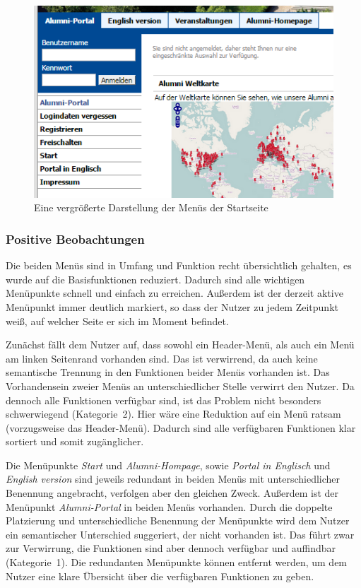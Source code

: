 \begin{figure}[h]
	\centering
		\includegraphics[width=\textwidth]{figures/menu.png}
	\caption{Eine vergrößerte Darstellung der Menüs der Startseite}
	\label{fig:menu}
\end{figure}


\subsubsection*{Positive Beobachtungen}
Die beiden Menüs sind in Umfang und Funktion recht übersichtlich gehalten, es wurde auf die Basisfunktionen reduziert. Dadurch sind alle wichtigen Menüpunkte schnell und einfach zu erreichen. 
Außerdem ist der derzeit aktive Menüpunkt immer deutlich markiert, so dass der Nutzer zu jedem Zeitpunkt weiß, auf welcher Seite er sich im Moment befindet.

{Zunächst fällt dem Nutzer auf, dass sowohl ein Header-Menü, als auch ein Menü am linken Seitenrand vorhanden sind. Das ist verwirrend, da auch keine semantische Trennung in den Funktionen beider Menüs vorhanden ist. 
}{Das Vorhandensein zweier Menüs an unterschiedlicher Stelle verwirrt den Nutzer. Da dennoch alle Funktionen verfügbar sind, ist das Problem nicht besonders schwerwiegend (Kategorie~2).
}{Hier wäre eine Reduktion auf ein Menü ratsam (vorzugsweise das Header-Menü). Dadurch sind alle verfügbaren Funktionen klar sortiert und somit zugänglicher. 
}\label{prob:start:menues}

{Die Menüpunkte \emph{Start} und \emph{Alumni-Hompage}, sowie \emph{Portal in Englisch} und \emph{English version} sind jeweils redundant in beiden Menüs mit unterschiedlicher Benennung angebracht, verfolgen aber den gleichen Zweck. Außerdem ist der Menüpunkt \emph{Alumni-Portal} in beiden Menüs vorhanden.
}
{Durch die doppelte Platzierung und unterschiedliche Benennung der Menüpunkte wird dem Nutzer ein semantischer Unterschied suggeriert, der nicht vorhanden ist. Das führt zwar zur Verwirrung, die Funktionen sind aber dennoch verfügbar und auffindbar (Kategorie~1).
}
{Die redundanten Menüpunkte können entfernt werden, um dem Nutzer eine klare Übersicht über die verfügbaren Funktionen zu geben. 
}\label{prob:start:funktionen}


